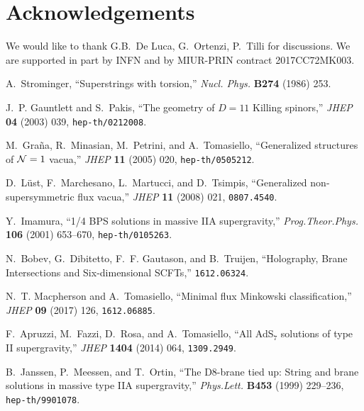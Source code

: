 \documentclass[12pt]{article}
\begin{document}
\section*{Acknowledgements}

We would like to thank G.B.~De Luca, G.~Ortenzi, P.~Tilli for discussions. We are supported in part by INFN and by MIUR-PRIN contract 2017CC72MK003.

\providecommand{\href}[2]{#2}\begin{thebibliography}{10}

A.~Strominger, ``Superstrings with torsion,'' {\em Nucl. Phys.} {\bf B274}
  (1986)
253.


J.~P. Gauntlett and S.~Pakis, ``{The geometry of $D=11$ Killing spinors},''
  {\em JHEP} {\bf 04} (2003) 039,
\href{http://arXiv.org/abs/hep-th/0212008}{{\tt hep-th/0212008}}.


M.~Gra{\~n}a, R.~Minasian, M.~Petrini, and A.~Tomasiello, ``Generalized
  structures of {${\cal N}=1$} vacua,'' {\em JHEP} {\bf 11} (2005) 020,
\href{http://arXiv.org/abs/hep-th/0505212}{{\tt hep-th/0505212}}.


D.~{L\"ust}, F.~Marchesano, L.~Martucci, and D.~Tsimpis, ``{Generalized
  non-supersymmetric flux vacua},'' {\em JHEP} {\bf 11} (2008) 021,
\href{http://arXiv.org/abs/0807.4540}{{\tt 0807.4540}}.


Y.~Imamura, ``{1/4 BPS solutions in massive IIA supergravity},'' {\em
  Prog.Theor.Phys.} {\bf 106} (2001) 653--670,
\href{http://arXiv.org/abs/hep-th/0105263}{{\tt hep-th/0105263}}.


N.~Bobev, G.~Dibitetto, F.~F. Gautason, and B.~Truijen, ``{Holography, Brane
  Intersections and Six-dimensional SCFTs},''
\href{http://arXiv.org/abs/1612.06324}{{\tt 1612.06324}}.


N.~T. Macpherson and A.~Tomasiello, ``{Minimal flux Minkowski
  classification},'' {\em JHEP} {\bf 09} (2017) 126,
\href{http://arXiv.org/abs/1612.06885}{{\tt 1612.06885}}.


F.~Apruzzi, M.~Fazzi, D.~Rosa, and A.~Tomasiello, ``{All AdS$_7$ solutions of
  type II supergravity},'' {\em JHEP} {\bf 1404} (2014) 064,
\href{http://arXiv.org/abs/1309.2949}{{\tt 1309.2949}}.


B.~Janssen, P.~Meessen, and T.~Ortin, ``{The D8-brane tied up: String and brane
  solutions in massive type IIA supergravity},'' {\em Phys.Lett.} {\bf B453}
  (1999) 229--236,
\href{http://arXiv.org/abs/hep-th/9901078}{{\tt hep-th/9901078}}.



\end{thebibliography}
\end{document}
